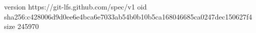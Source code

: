 version https://git-lfs.github.com/spec/v1
oid sha256:c428006d9d0ee6e4bca6e7033ab54b0b10b5ca168046685ca0247dec150627f4
size 245970
